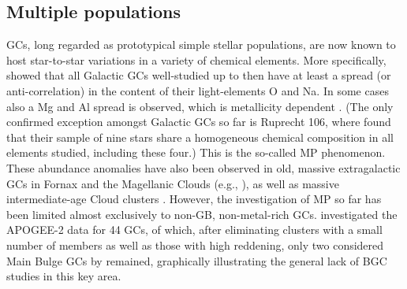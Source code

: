 \documentclass[onecolumn]{aa}
\begin{document}
\subsection{Multiple populations}
GCs, long regarded as prototypical simple stellar populations, are now known to host star-to-star variations in a variety of chemical elements.  More specifically, \citet{Carretta2009} showed that all Galactic GCs well-studied up to then have at least a spread (or anti-correlation) in the content of their light-elements O and
Na. In some cases also a Mg and Al spread is observed, which is metallicity dependent \citep[e.g.,][]{Ventura2016}. (The only confirmed exception amongst Galactic GCs so far is Ruprecht 106, where \citet{Villanova2013} found that their sample of nine stars share a homogeneous chemical composition in all elements studied, including these four.) 
This is the so-called MP phenomenon. 
These abundance anomalies have also been observed in old, massive extragalactic GCs in Fornax \citep{Letarte2006, Larsen2012} and the  Magellanic Clouds (e.g., \citealt{Mucciarelli2009}), as well as massive intermediate-age Cloud clusters \citep{Martocchia2019}.
However, the investigation of MP so far has been limited almost
exclusively to non-GB, non-metal-rich GCs. \citet{Meszaros2020} investigated the APOGEE-2 data for 44 GCs, of which, after eliminating clusters with a small number of members as well as those with high reddening, only two considered Main Bulge GCs by \citet{Massari2019} remained, graphically illustrating the general lack of BGC studies in this key area.
\end{document}
